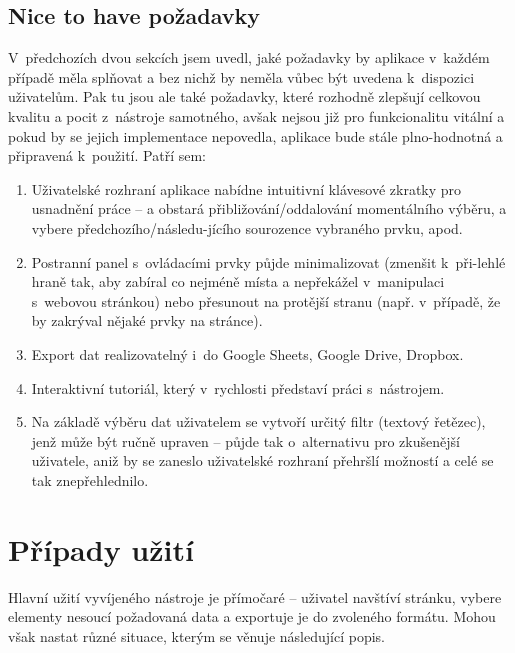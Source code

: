 \documentclass[thesis=B,czech]{FITthesis}[2012/06/26]
\begin{document}
\subsection{Nice to have požadavky}
V~předchozích dvou sekcích jsem uvedl, jaké požadavky by aplikace v~každém případě měla splňovat a bez nichž by neměla vůbec být uvedena k~dispozici uživatelům. Pak tu jsou ale také požadavky, které rozhodně zlepšují celkovou kvalitu a pocit z~nástroje samotného, avšak nejsou již pro funkcionalitu vitální a pokud by se jejich implementace nepovedla, aplikace bude stále plno-hodnotná a připravená k~použití. Patří sem:
\begin{enumerate}[+1)]
	\item Uživatelské rozhraní aplikace nabídne intuitivní klávesové zkratky pro usnadnění práce -- \textsf{} a \textsf{} obstará přibližování/oddalování momentálního výběru, \textsf{} a \textsf{} vybere předchozího/následu-jícího sourozence vybraného prvku, apod.
	\item Postranní panel s~ovládacími prvky půjde minimalizovat (zmenšit k~při-lehlé hraně tak, aby zabíral co nejméně místa a nepřekážel v~manipulaci s~webovou stránkou) nebo přesunout na protější stranu (např. v~případě, že by zakrýval nějaké prvky na stránce).
	\item Export dat realizovatelný i~do Google Sheets, Google Drive, Dropbox.
	\item Interaktivní tutoriál, který v~rychlosti představí práci s~nástrojem.
	\item Na základě výběru dat uživatelem se vytvoří určitý filtr (textový řetězec), jenž může být ručně upraven -- půjde tak o~alternativu pro zkušenější uživatele, aniž by se zaneslo uživatelské rozhraní přehršlí možností a celé se tak znepřehlednilo.
\end{enumerate}


\section{Případy užití}
Hlavní užití vyvíjeného nástroje je přímočaré -- uživatel navštíví stránku, vybere elementy nesoucí požadovaná data a exportuje je do zvoleného formátu. Mohou však nastat různé situace, kterým se věnuje následující popis.
\end{document}
